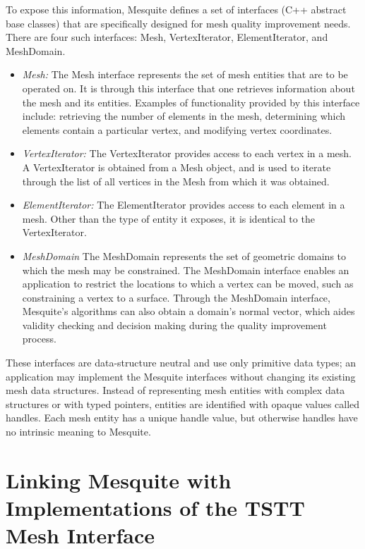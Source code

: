 \documentclass[letter]{report}
\begin{document}
To expose this information, Mesquite defines a set of interfaces 
(C++ abstract base classes) that are specifically designed for mesh
quality improvement needs.  There are four such interfaces: Mesh,
VertexIterator, ElementIterator, and MeshDomain.
\begin{itemize}
\item {\it Mesh:} The Mesh interface represents the set of mesh
entities that are to be operated on.  It is through this interface
that one retrieves information about the mesh and its entities.
Examples of functionality provided by this interface include:
retrieving the number of elements in the mesh, determining which
elements contain a particular vertex, and modifying vertex
coordinates.
\item {\it VertexIterator:} The VertexIterator provides access to each
vertex in a mesh.  A VertexIterator is obtained from a Mesh object,
and is used to iterate through the list of all vertices in the Mesh
from which it was obtained.
\item {\it ElementIterator:} The ElementIterator provides access to
each element in a mesh.  Other than the type of entity it exposes, it
is identical to the VertexIterator.
\item {\it MeshDomain} The MeshDomain represents the set of geometric
domains to which the mesh may be constrained.  The MeshDomain
interface enables an application to restrict the locations to which a
vertex can be moved, such as constraining a vertex to a surface.
Through the MeshDomain interface, Mesquite's algorithms can also
obtain a domain's normal vector, which aides validity checking and 
decision making during the quality improvement process.
\end{itemize}
These interfaces are data-structure neutral and use only primitive
data types; an application may implement the Mesquite interfaces
without changing its existing mesh data structures.  Instead of
representing mesh entities with complex data structures or with typed
pointers, entities are identified with opaque values called handles.
Each mesh entity has a unique handle value, but otherwise handles have
no intrinsic meaning to Mesquite.  

\section{Linking Mesquite with Implementations of the TSTT Mesh Interface} 
\label{sec:TSTT}
\end{document}
